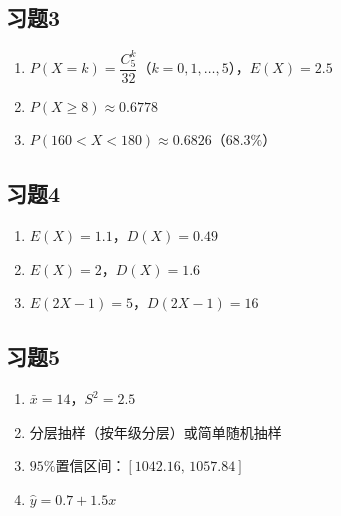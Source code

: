 \documentclass[a4paper,12pt]{ctexart}
\begin{document}
\subsection*{习题3}
\begin{enumerate}
  \item $P(X=k)=\dfrac{C_5^k}{32}$（$k=0,1,\dots,5$），$E(X)=2.5$
  \item $P(X\ge8)\approx0.6778$
  \item $P(160<X<180)\approx0.6826$（$68.3\%$）
\end{enumerate}

\subsection*{习题4}
\begin{enumerate}
  \item $E(X)=1.1$，$D(X)=0.49$
  \item $E(X)=2$，$D(X)=1.6$
  \item $E(2X-1)=5$，$D(2X-1)=16$
\end{enumerate}

\subsection*{习题5}
\begin{enumerate}
  \item $\bar x=14$，$S^2=2.5$
  \item 分层抽样（按年级分层）或简单随机抽样
  \item $95\%$置信区间：$[1042.16,\,1057.84]$
  \item $\hat y=0.7+1.5x$
\end{enumerate}
\end{document}
